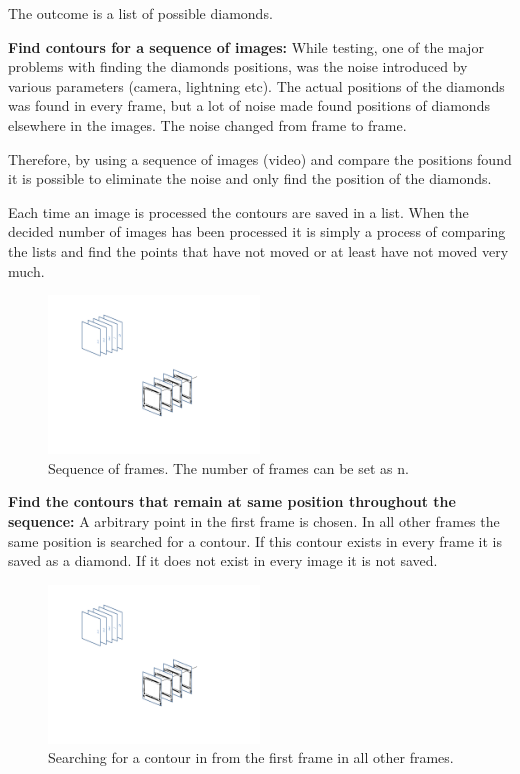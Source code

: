 The outcome is a list of possible diamonds.

\textbf{Find contours for a sequence of images:}
While testing, one of the major problems with finding the diamonds positions, was the noise introduced by various parameters (camera, lightning etc). The actual positions of the diamonds was found in every frame, but a lot of noise made found positions of diamonds elsewhere in the images. 
The noise changed from frame to frame.

Therefore, by using a sequence of images (video) and compare the positions found it is possible to eliminate the noise and only find the position of the diamonds.

Each time an image is processed the contours are saved in a list. When the decided number of images has been processed it is simply a process of comparing the lists and find the points that have not moved or at least have not moved very much.

\begin{figure}[htb]
\begin{center}
\leavevmode
\includegraphics[width=0.5\textwidth]{images/image_seq_numbers.pdf}
\end{center}
\caption{Sequence of frames. The number of frames can be set as n.}
\label{fig:seq_img}
\end{figure}

\textbf{Find the contours that remain at same position throughout the sequence:}
A arbitrary point in the first frame is chosen. In all other frames the same position is searched for a contour. If this contour exists in every frame it is saved as a diamond. If it does not exist in every image it is not saved.

\begin{figure}[htb]
\begin{center}
\leavevmode
\includegraphics[width=0.5\textwidth]{images/image_seq_pool.pdf}
\end{center}
\caption{Searching for a contour in from the first frame in all other frames.}
\label{fig:seq_img_pool}
\end{figure}

